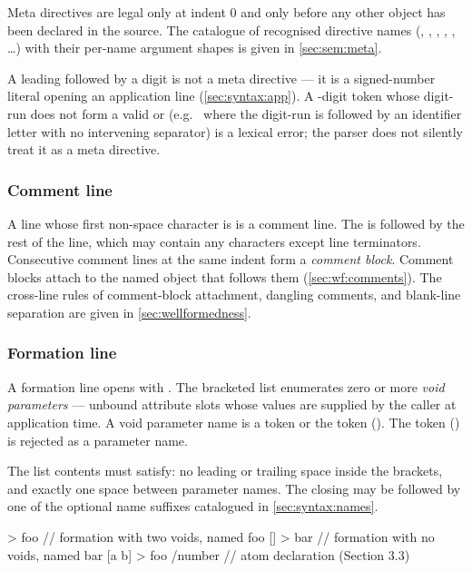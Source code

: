 Meta directives are legal only at indent 0 and only before any other object
  has been declared in the source.
The catalogue of recognised directive names
  (, , , , , \ldots)
  with their per-name argument shapes is given in \cref{sec:sem:meta}.

A leading \ff{+} followed by a digit is not a meta directive ---
  it is a signed-number literal opening an application line
  (\cref{sec:syntax:app}).
A \ff{+}-digit token whose digit-run does not form a valid  or
   (e.g.\  where the digit-run is followed by an
  identifier letter with no intervening separator) is a lexical error;
  the parser does not silently treat it as a meta directive.

\subsubsection{Comment line}\label{sec:syntax:comment}

A line whose first non-space character is \ff{\#} is a comment line.
The \ff{\#} is followed by the rest of the line, which may contain any
  characters except line terminators.
Consecutive comment lines at the same indent form a \emph{comment block}.
Comment blocks attach to the named object that follows them
  (\cref{sec:wf:comments}).
The cross-line rules of comment-block attachment, dangling comments, and
  blank-line separation are given in \cref{sec:wellformedness}.

\subsubsection{Formation line}\label{sec:syntax:formation}

A formation line opens with \ff{[}.
The bracketed list enumerates zero or more \emph{void parameters} ---
  unbound attribute slots whose values are supplied by the caller at
  application time.
A void parameter name is a  token or the  token ().
The  token (\ff{\textasciicircum{}}) is rejected as a parameter name.

The list contents must satisfy:
  no leading or trailing space inside the brackets,
  and exactly one space between parameter names.
The closing \ff{]} may be followed by one of the optional name suffixes
  catalogued in \cref{sec:syntax:names}.

\begin{ffcode}
[a b] > foo            // formation with two voids, named foo
[] > bar               // formation with no voids, named bar
[a b] > foo /number    // atom declaration (Section 3.3)
\end{ffcode}

